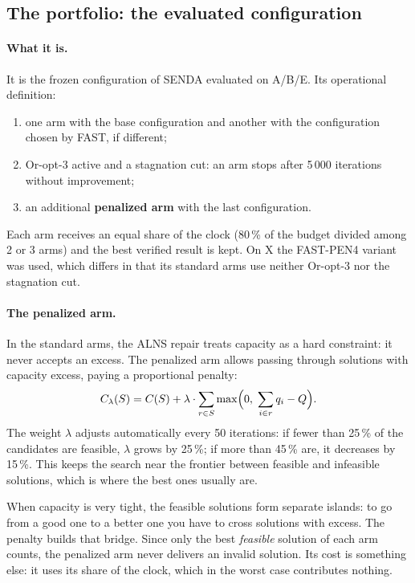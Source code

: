 \documentclass[11pt,a4paper]{article}
\begin{document}
\subsection{The portfolio: the evaluated configuration}
\label{sec:portafolio}

\paragraph{What it is.} It is the frozen configuration of SENDA evaluated on A/B/E. Its operational
definition:
\begin{enumerate}[leftmargin=1.5em]
\item one arm with the base configuration and another with the configuration chosen by FAST, if
different;
\item Or-opt-3 active and a stagnation cut: an arm stops after 5\,000 iterations without improvement;
\item an additional \textbf{penalized arm} with the last configuration.
\end{enumerate}
Each arm receives an equal share of the clock (80\,\% of the budget divided among 2 or 3 arms) and the
best verified result is kept. On X the FAST-PEN4 variant was used, which differs in that its standard
arms use neither Or-opt-3 nor the stagnation cut.

\paragraph{The penalized arm.} In the standard arms, the ALNS repair treats capacity as a hard
constraint: it never accepts an excess. The penalized arm allows passing through solutions with
capacity excess, paying a proportional penalty:
\begin{equation}
C_\lambda(S)=C(S)+\lambda\cdot\sum_{r\in S}\max\Bigl(0,\;\sum_{i\in r}q_i-Q\Bigr).
\end{equation}
The weight $\lambda$ adjusts automatically every 50 iterations: if fewer than 25\,\% of the candidates
are feasible, $\lambda$ grows by 25\,\%; if more than 45\,\% are, it decreases by 15\,\%. This keeps
the search near the frontier between feasible and infeasible solutions, which is where the best ones
usually are.

\begin{ideaclave}
When capacity is very tight, the feasible solutions form separate islands: to go from a good one to
a better one you have to cross solutions with excess. The penalty builds that bridge. Since only the
best \emph{feasible} solution of each arm counts, the penalized arm never delivers an invalid
solution. Its cost is something else: it uses its share of the clock, which in the worst case
contributes nothing.
\end{ideaclave}
\end{document}
